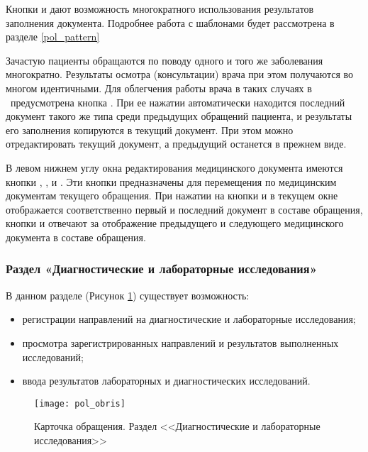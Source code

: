 Кнопки   и   дают возможность многократного использования результатов заполнения документа. Подробнее работа с шаблонами будет рассмотрена в разделе \ref{pol_pattern}

\begin{prim}
 Зачастую пациенты обращаются по поводу одного и того же заболевания многократно. Результаты осмотра (консультации) врача при этом получаются во многом идентичными. Для облегчения работы врача в таких случаях в \tmis~предусмотрена кнопка . При ее нажатии автоматически находится последний документ такого же типа среди предыдущих обращений пациента, и результаты его заполнения копируются в текущий документ. При этом можно отредактировать текущий документ, а предыдущий останется в прежнем виде.
\end{prim}

В левом нижнем углу окна редактирования медицинского документа имеются кнопки  \btn{$\gg$}, \btn{$\ll$}, \btn{>\rule{1pt}{8pt}}  и \btn{\rule{1pt}{8pt}<}. Эти кнопки предназначены для перемещения по медицинским документам текущего обращения. При нажатии на кнопки  \btn{>\rule{1pt}{8pt}}  и \btn{\rule{1pt}{8pt}<}   в текущем окне отображается соответственно первый и последний документ в составе обращения, кнопки  \btn{$\gg$} и \btn{$\ll$} отвечают за отображение предыдущего и следующего медицинского документа в составе обращения.
  
\subsubsection{Раздел «Диагностические и лабораторные исследования»} \label{pol_obr_is}

В данном разделе (Рисунок \ref{img_pol_obris}) существует возможность:
\begin{itemize}
 \item регистрации направлений на диагностические и лабораторные исследования;
 \item просмотра зарегистрированных направлений и результатов выполненных исследований;
 \item ввода результатов лабораторных и диагностических исследований.
\end{itemize}

 \begin{figure}[ht]\centering
   \texttt{[image: pol\_obris]}
   \caption{Карточка обращения. Раздел <<Диагностические и лабораторные исследования>>}
   \label{img_pol_obris}
 \end{figure}
 
